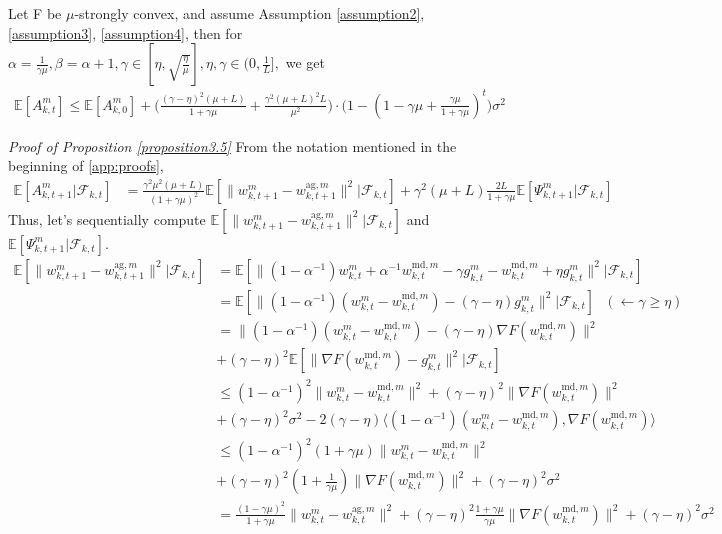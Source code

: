 \documentclass[11pt]{article}
\begin{document}
\begin{proposition} \label{proposition3.5}
Let F be $\mu$-strongly convex, and assume Assumption \ref{assumption2}, \ref{assumption3}, \ref{assumption4}, then for $\alpha=\frac{1}{\gamma\mu}, \beta=\alpha+1, \gamma \in [\eta, \sqrt{\frac{\eta}{\mu}}], \eta, \gamma \in (0, \frac{1}{L}], $ we get
\begin{align*}
    \mathbb{E}[A_{k, t}^m] \leq \mathbb{E}[A_{k, 0}^m] + \Big( \frac{(\gamma-\eta)^2(\mu+L)}{1+\gamma\mu}+\frac{\gamma^2(\mu+L)^2 L}{\mu^2}\Big)\cdot \Big( 1-(1-\gamma\mu+\frac{\gamma\mu}{1+\gamma\mu})^t\Big)\sigma^2
\end{align*}
\end{proposition}

\emph{Proof of Proposition \ref{proposition3.5}}
\textrm{ } From the notation mentioned in the beginning of \cref{app:proofs},
\begin{align} \label{eq3.5-1}
    \mathbb{E}[A_{k, t+1}^m|\mathcal{F}_{k, t}] &= \frac{\gamma^2\mu^2 (\mu+L)}{(1+\gamma\mu)^2}\mathbb{E}[\|w_{k, t+1}^m - w_{k, t+1}^{\textrm{ag}, m}\|^2|\mathcal{F}_{k, t}] + \gamma^2(\mu+L)\frac{2L}{1+\gamma\mu}\mathbb{E}[\Psi_{k, t+1}^m|\mathcal{F}_{k, t}]
\end{align}
Thus, let's sequentially compute $\mathbb{E}[\|w_{k, t+1}^m - w_{k, t+1}^{\textrm{ag}, m}\|^2|\mathcal{F}_{k, t}]$ and $\mathbb{E}[\Psi_{k, t+1}^m|\mathcal{F}_{k, t}]$.
\begin{align*}
    \mathbb{E}[\|w_{k, t+1}^m - w_{k, t+1}^{\textrm{ag}, m}\|^2|\mathcal{F}_{k, t}] &= \mathbb{E}[\|(1-\alpha^{-1})w_{k, t}^m + \alpha^{-1}w_{k, t}^{\textrm{md}, m} - \gamma g_{k, t}^m - w_{k, t}^{\textrm{md}, m} + \eta g_{k, t}^m\|^2|\mathcal{F}_{k, t}] \\
    &= \mathbb{E}[\|(1-\alpha^{-1})(w_{k, t}^m - w_{k, t}^{\textrm{md}, m}) - (\gamma-\eta)g_{k, t}^m\|^2|\mathcal{F}_{k, t}] \textrm{ } (\leftarrow \gamma \geq \eta) \\
    &= \|(1-\alpha^{-1})(w_{k, t}^m - w_{k, t}^{\textrm{md}, m}) - (\gamma-\eta)\nabla F(w_{k, t}^{\textrm{md}, m})\|^2 \\
    &+ (\gamma - \eta)^2\mathbb{E}[\|\nabla F(w_{k, t}^{\textrm{md}, m}) - g_{k, t}^m\|^2|\mathcal{F}_{k, t}] \\
    &\leq (1-\alpha^{-1})^2 \|w_{k, t}^m - w_{k, t}^{\textrm{md}, m}\|^2 + (\gamma-\eta)^2 \|\nabla F(w_{k, t}^{\textrm{md}, m})\|^2 \\
    &+ (\gamma-\eta)^2 \sigma^2 - 2(\gamma-\eta) \langle (1-\alpha^{-1})(w_{k, t}^m - w_{k, t}^{\textrm{md}, m}), \nabla F(w_{k, t}^{\textrm{md}, m})\rangle \\
    &\leq (1-\alpha^{-1})^2(1+\gamma\mu) \|w_{k, t}^m - w_{k, t}^{\textrm{md}, m}\|^2 \\
    &+ (\gamma-\eta)^2(1+\frac{1}{\gamma\mu}) \|\nabla F(w_{k, t}^{\textrm{md}, m})\|^2 + (\gamma-\eta)^2 \sigma^2 \\
    &= \frac{(1-\gamma\mu)^2}{1+\gamma\mu}\|w_{k, t}^m - w_{k, t}^{\textrm{ag}, m}\|^2 + (\gamma-\eta)^2\frac{1+\gamma\mu}{\gamma\mu}\|\nabla F(w_{k, t}^{\textrm{md}, m})\|^2 + (\gamma-\eta)^2\sigma^2
\end{align*}
\end{document}
